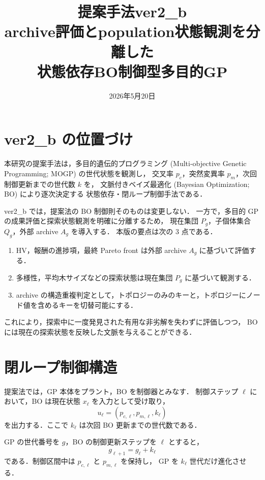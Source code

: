 \documentclass[a4paper,11pt]{ltjsarticle}
\title{提案手法ver2\_b\\archive評価とpopulation状態観測を分離した\\状態依存BO制御型多目的GP}
\author{}
\date{2026年5月20日}
\begin{document}
\maketitle

\section{ver2\_b の位置づけ}

本研究の提案手法は，多目的遺伝的プログラミング
(Multi-objective Genetic Programming; MOGP) の世代状態を観測し，
交叉率 \(p_c\)，突然変異率 \(p_m\)，次回制御更新までの世代数 \(k\) を，
文脈付きベイズ最適化 (Bayesian Optimization; BO) により逐次決定する
状態依存・閉ループ制御手法である．

ver2\_b では，提案法の BO 制御則そのものは変更しない．
一方で，多目的 GP の成果評価と探索状態観測を明確に分離するため，
現在集団 \(P_g\)，子個体集合 \(Q_g\)，外部 archive \(A_g\) を導入する．
本版の要点は次の 3 点である．

\begin{enumerate}[leftmargin=3em]
  \item HV，報酬の進捗項，最終 Pareto front は外部 archive \(A_g\) に基づいて評価する．
  \item 多様性，平均木サイズなどの探索状態は現在集団 \(P_g\) に基づいて観測する．
  \item archive の構造重複判定として，トポロジーのみのキーと，トポロジーにノード値を含めるキーを切替可能にする．
\end{enumerate}

これにより，探索中に一度発見された有用な非劣解を失わずに評価しつつ，
BO には現在の探索状態を反映した文脈を与えることができる．

\section{閉ループ制御構造}

提案法では，GP 本体をプラント，BO を制御器とみなす．
制御ステップ \(\ell\) において，BO は現在状態 \(x_\ell\) を入力として受け取り，
\begin{equation}
u_\ell=(p_{c,\ell},p_{m,\ell},k_\ell)
\end{equation}
を出力する．ここで \(k_\ell\) は次回 BO 更新までの世代数である．

GP の世代番号を \(g\)，BO の制御更新ステップを \(\ell\) とすると，
\begin{equation}
g_{\ell+1}=g_\ell+k_\ell
\end{equation}
である．制御区間中は \(p_{c,\ell}\) と \(p_{m,\ell}\) を保持し，
GP を \(k_\ell\) 世代だけ進化させる．
\end{document}
